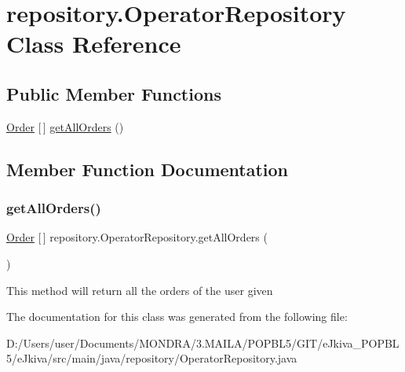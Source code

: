 \hypertarget{classrepository_1_1_operator_repository}{}\section{repository.\+Operator\+Repository Class Reference}
\label{classrepository_1_1_operator_repository}
\subsection*{Public Member Functions}
\begin{DoxyCompactItemize}
\item 
\mbox{\hyperlink{classentity_1_1_order}{Order}} \mbox{[}$\,$\mbox{]} \mbox{\hyperlink{classrepository_1_1_operator_repository_ac371d50c4b824da2d066da12be265aef}{get\+All\+Orders}} ()
\end{DoxyCompactItemize}


\subsection{Member Function Documentation}
\mbox{\label{classrepository_1_1_operator_repository_ac371d50c4b824da2d066da12be265aef}} 
\subsubsection{\texorpdfstring{get\+All\+Orders()}{getAllOrders()}}
{\footnotesize\ttfamily \mbox{\hyperlink{classentity_1_1_order}{Order}} \mbox{[}$\,$\mbox{]} repository.\+Operator\+Repository.\+get\+All\+Orders (\begin{DoxyParamCaption}{ }\end{DoxyParamCaption})\hspace{0.3cm}{\ttfamily [inline]}}

This method will return all the orders of the user given 

The documentation for this class was generated from the following file\+:\begin{DoxyCompactItemize}
\item 
D\+:/\+Users/user/\+Documents/\+M\+O\+N\+D\+R\+A/3.\+M\+A\+I\+L\+A/\+P\+O\+P\+B\+L5/\+G\+I\+T/e\+Jkiva\+\_\+\+P\+O\+P\+B\+L5/e\+Jkiva/src/main/java/repository/Operator\+Repository.\+java\end{DoxyCompactItemize}
